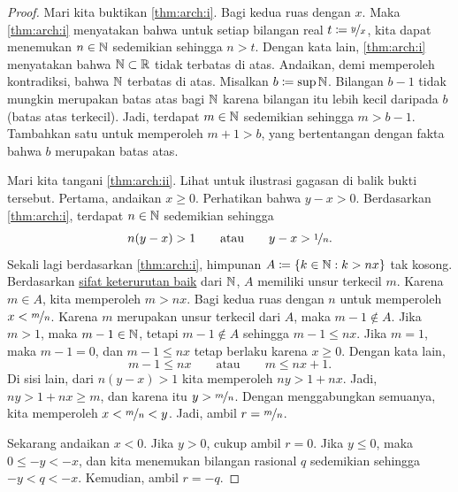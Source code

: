 \begin{proof}
Mari kita buktikan \ref{thm:arch:i}.  Bagi kedua ruas dengan $x$.
Maka \ref{thm:arch:i} menyatakan bahwa untuk setiap bilangan real $t\coloneqq \nicefrac{y}{x}$,
kita dapat menemukan $n \in {\mathbb{N}}$ sedemikian sehingga $n > t$.  Dengan kata lain,
\ref{thm:arch:i} menyatakan bahwa ${\mathbb{N}} \subset {\mathbb{R}}$ tidak terbatas di atas.
Andaikan, demi memperoleh kontradiksi, bahwa ${\mathbb{N}}$ terbatas di atas.  Misalkan $b \coloneqq \sup {\mathbb{N}}$.
Bilangan $b-1$ tidak mungkin merupakan batas atas bagi ${\mathbb{N}}$ karena bilangan itu lebih kecil
daripada $b$ (batas atas terkecil).  Jadi, terdapat $m \in {\mathbb{N}}$ sedemikian sehingga $m > b-1$.
Tambahkan satu untuk memperoleh $m+1 > b$, yang bertentangan dengan fakta bahwa $b$ merupakan
batas atas.

\begin{myfigureht}
\caption{Gagasan bukti kerapatan $\Q$: Carilah $n$ sedemikian sehingga $y-x >
\nicefrac{1}{n}$, lalu ambil $m$ terkecil sedemikian sehingga $\nicefrac{m}{n} > x$.\label{figdensofQ}}
\end{myfigureht}
Mari kita tangani \ref{thm:arch:ii}.
Lihat 
untuk ilustrasi gagasan di balik bukti tersebut.
Pertama, andaikan $x \geq 0$.
Perhatikan bahwa $y-x > 0$.
Berdasarkan \ref{thm:arch:i}, terdapat $n \in {\mathbb{N}}$ sedemikian sehingga
\begin{equation*}
n(y-x) > 1
\qquad \text{atau} \qquad
y-x > \nicefrac{1}{n}.
\end{equation*}
Sekali lagi berdasarkan \ref{thm:arch:i}, himpunan
$A \coloneqq \{ k \in {\mathbb{N}} : k > nx \}$ tak kosong.  Berdasarkan
\hyperlink{wop:link}{sifat keterurutan baik}
dari ${\mathbb{N}}$, $A$ memiliki unsur terkecil $m$.
Karena $m \in A$, kita memperoleh $m > nx$.
Bagi kedua ruas dengan $n$ untuk memperoleh $x < \nicefrac{m}{n}$.
Karena $m$ merupakan unsur terkecil
dari $A$, maka $m-1 \notin A$.
Jika $m > 1$, maka $m-1 \in {\mathbb{N}}$, tetapi $m-1 \notin A$ sehingga $m-1 \leq nx$.
Jika $m=1$,
maka $m-1 = 0$, dan $m-1 \leq nx$ tetap berlaku karena $x \geq 0$.
Dengan kata lain,
\begin{equation*}
m-1 \leq nx \qquad \text{atau} \qquad m \leq nx+1 .
\end{equation*}
Di sisi lain,
dari $n(y-x) > 1$ kita memperoleh $ny > 1+nx$.
Jadi, $ny > 1+nx \geq m$, dan karena itu $y > \nicefrac{m}{n}$.
Dengan menggabungkan semuanya, kita memperoleh $x < \nicefrac{m}{n} < y$.
Jadi, ambil $r = \nicefrac{m}{n}$.

Sekarang andaikan $x < 0$.  Jika $y > 0$, cukup ambil $r=0$.  Jika
$y \leq 0$, maka $0 \leq -y < -x$, dan kita
menemukan bilangan rasional $q$ sedemikian sehingga $-y < q < -x$.  Kemudian, ambil $r = -q$.
\end{proof}

